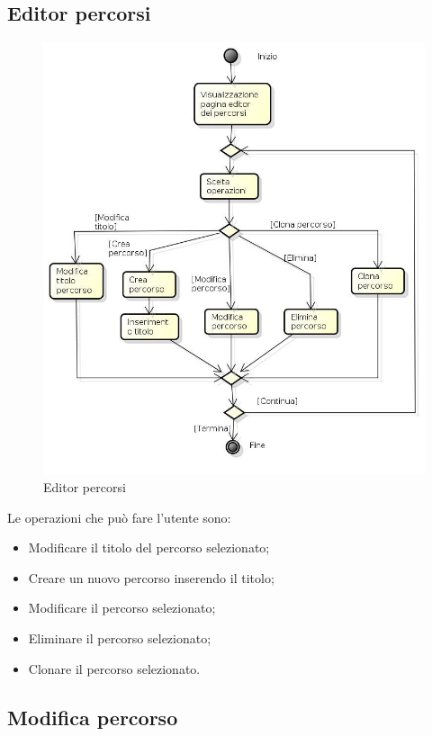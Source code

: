 \subsection{Editor percorsi}

\begin{figure}[h!]
		\centering
		\includegraphics[scale=.5]{img/attivita/Editor_percorsi.jpg}
		\caption{Editor percorsi}
		\label{fig:Editor_percorsi}
\end{figure}

Le operazioni che può fare l'utente sono:
\begin{itemize}
\item Modificare il titolo del percorso selezionato;
\item Creare un nuovo percorso inserendo il titolo;
\item Modificare il percorso selezionato;
\item Eliminare il percorso selezionato; 
\item Clonare il percorso selezionato.
\end{itemize}

\newpage

\subsection{Modifica percorso}

